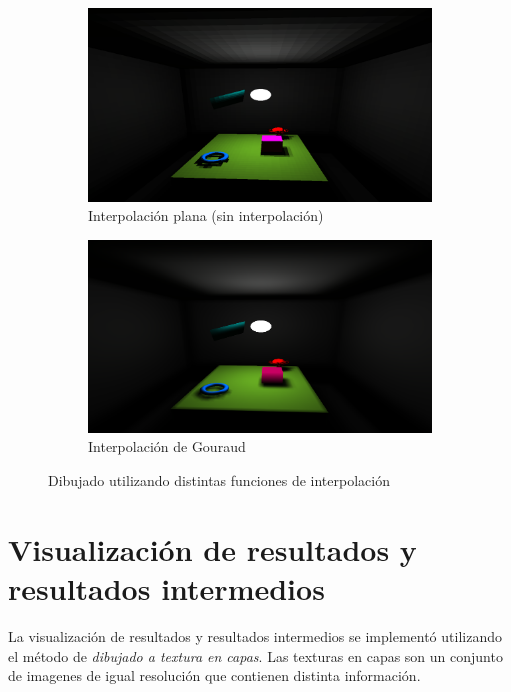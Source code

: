 \begin{figure}[H]
	\centering
	\begin{subfigure}{0.7\textwidth}
		\centering
		\includegraphics[width=1\linewidth]{assets/cornell-flat}
		\caption{Interpolación plana (sin interpolación)}
	\end{subfigure}
	\begin{subfigure}{0.7\textwidth}
		\centering
		\includegraphics[width=1\linewidth]{assets/cornell-gouraud}
		\caption{Interpolación de Gouraud}
	\end{subfigure}
	\caption{Dibujado utilizando distintas funciones de interpolación}
	\label{img:interpolationres}
\end{figure}

\section {Visualización de resultados y resultados intermedios}

La visualización de resultados y resultados intermedios se implementó utilizando el método de \textit{dibujado a textura en capas}. Las texturas en capas son un conjunto de imagenes de igual resolución que contienen distinta información.

